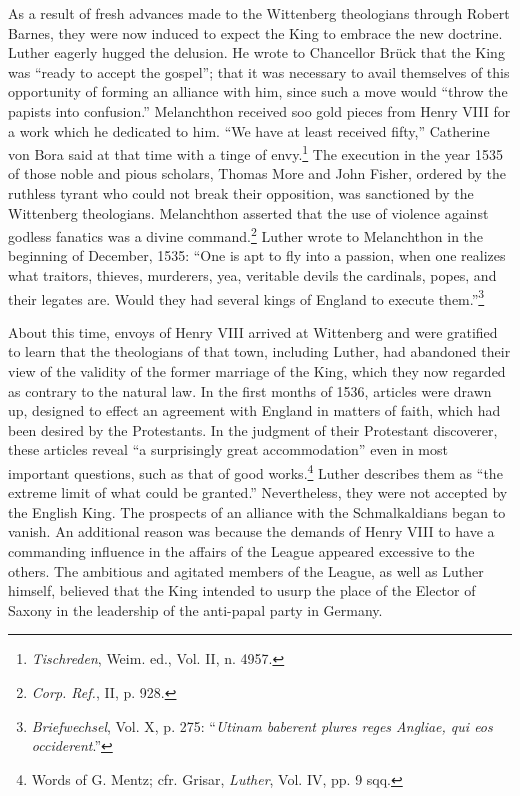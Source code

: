 As a result of fresh advances made to the Wittenberg theologians
through Robert Barnes, they were now induced to expect the King
to embrace the new doctrine. Luther eagerly hugged the delusion. He
wrote to Chancellor Brück that the King was “ready to accept the
gospel”; that it was necessary to avail themselves of this opportunity
of forming an alliance with him, since such a move would “throw
the papists into confusion.” Melanchthon received soo gold pieces
from Henry VIII for a work which he dedicated to him. “We have
at least received fifty,” Catherine von Bora said at that time with a
tinge of envy.\footnote{\textit{Tischreden}, Weim. ed., Vol. II, n. 4957.}
 The execution in the year 1535 of those noble and
pious scholars, Thomas More and John Fisher, ordered by the ruthless tyrant
who could not break their opposition, was sanctioned
by the Wittenberg theologians. Melanchthon asserted that the use
of violence against godless fanatics was a divine command.\footnote{\textit{Corp. Ref.}, II, p. 928.}
Luther wrote to Melanchthon in the beginning of December, 1535: “One
is apt to fly into a passion, when one realizes what traitors, thieves,
murderers, yea, veritable devils the cardinals, popes, and their legates
are. Would they had several kings of England to execute them.”\footnote{\textit{Briefwechsel}, Vol. X, p. 275: “\textit{Utinam baberent plures reges Angliae, qui eos occiderent}.”}

About this time, envoys of Henry VIII arrived at Wittenberg
and were gratified to learn that the theologians of that town, including
Luther, had abandoned their view of the validity of the
former marriage of the King, which they now regarded as contrary
to the natural law. In the first months of 1536, articles were drawn
up, designed to effect an agreement with England in matters of
faith, which had been desired by the Protestants. In the judgment of
their Protestant discoverer, these articles reveal “a surprisingly great
accommodation” even in most important questions, such as that of
good works.\footnote{Words of G. Mentz; cfr. Grisar, \textit{Luther}, Vol. IV, pp. 9 sqq.}
 Luther describes them as “the extreme limit of what
could be granted.” Nevertheless, they were not accepted by the
English King. The prospects of an alliance with the Schmalkaldians
began to vanish. An additional reason was because the demands of
Henry VIII to have a commanding influence in the affairs of the
League appeared excessive to the others. The ambitious and agitated
members of the League, as well as Luther himself, believed that the
King intended to usurp the place of the Elector of Saxony in the
leadership of the anti-papal party in Germany.

